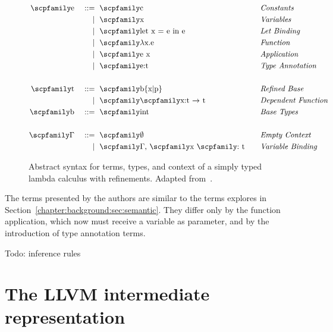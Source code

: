 \documentclass[
  oneside,
  english,
  coorientadorbanca,
  noabntexcite
]{ufsc-thesis-rn46-2019}
\def\bnfdef{::=}
\newcommand{\codett}[1]{\text{\scpfamily#1}}
\newcommand{\code}[1]{\text{\scpfamily\setlength\spaceskip{0.35em}#1}}
\newcommand{\bnfmore}[1]{            & \ & \mid{}    & \ \code{#1}}
\newcommand{\astprod}[2]{\code{#1} & \ & \bnfdef{} & \ \code{#2}}
\newcommand{\astmore}[1]{\bnfmore{#1}}
\newcommand{\typer}[2]{\code{#1 \codett{:} #2}}
\newcommand{\fnty}[2]{\code{#1 $\rightarrow$ #2}}
\begin{document}
\begin{figure}[ht]
  \begin{minipage}{\textwidth}
    \begin{alignat*}{4}
      \astprod{e}{c}                   & \quad & \textit{Constants}          \\
      \astmore{x}                      & \quad & \textit{Variables}          \\
      \astmore{let x = e in e}         & \quad & \textit{Let Binding}        \\
      \astmore{$\lambda$x.e}           & \quad & \textit{Function}           \\
      \astmore{e x}                    & \quad & \textit{Application}        \\
      \astmore{e:t}                    & \quad & \textit{Type Annotation}     \\
      \\
      \astprod{t}{b\{x|p\}}            & \quad & \textit{Refined Base}       \\
      \astmore{\fnty{x:t}{t}}          & \quad & \textit{Dependent Function} \\
      \astprod{b}{int}                 & \quad & \textit{Base Types}         \\
      \\
      \astprod{$\Gamma$}{$\emptyset$}  & \quad & \textit{Empty Context}      \\
      \astmore{$\Gamma$, \typer{x}{t}} & \quad & \textit{Variable Binding}   \\
    \end{alignat*}
  \end{minipage}
  \caption{
    Abstract syntax for terms, types, and context of a simply typed lambda calculus with refinements.
    Adapted from~\cite{jhala2020tutorial}.
  }\label{fig:refinement_terms}
\end{figure}

The terms presented by the authors are similar to the terms explores in Section~\ref{chapter:background:sec:semantic}.
They differ only by the function application, which now must receive a variable as parameter, and by the introduction of type annotation terms.

Todo: inference rules

\section{The LLVM intermediate representation}
\end{document}
